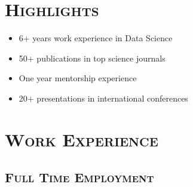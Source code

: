 \documentclass[10pt,a4paper]{moderncv}
\begin{document}
\section{\textsc{Highlights}}
\vspace{-0.5cm}
\begin{multicols}{2}
\begin{itemize}
\item 6+ years work experience in Data Science
\item 50+ publications in top science journals
\item One year mentorship experience
\item 20+ presentations in international conferences
\end{itemize}
\end{multicols}
\vspace{-0.5cm}

\section{\textsc{Work Experience}}
\subsection{\textsc{Full Time Employment}}
\end{document}
